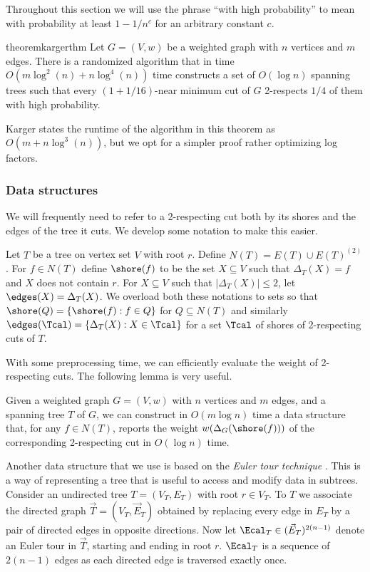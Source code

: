 Throughout this section we will use the phrase ``with high probability'' to mean with probability at least $1-1/n^c$ for an arbitrary constant $c$.
\begin{restatable}{theorem}{kargerthm} \label{thm:karger}
Let $G = (V,w)$ be a weighted graph with $n$ vertices and $m$ edges.  There is a randomized algorithm that in time 
$O(m \log^2(n) + n\log^4(n))$ time constructs a set of $O(\log n)$ spanning trees such that every $(1+1/16)$-near minimum cut of $G$ 2-respects $1/4$ of them with high probability.
\end{restatable}
Karger states the runtime of the algorithm in this theorem as $O(m + n \log^3(n))$, but we opt for a simpler proof rather optimizing log factors.

\subsubsection{Data structures}
We will frequently need to refer to a 2-respecting cut both by its shores and the edges of the tree it cuts.  We develop some notation to make this easier.
\begin{definition}
Let $T$ be a tree on vertex set $V$ with root $r$.  Define $N(T) = E(T) \cup E(T)^{(2)}$.
For $f \in N(T)$ define $\shore(f)$ to be the set $X \subseteq V$  such that $\Delta_T(X) = f$ and $X$ does not contain $r$.
For $X \subseteq V$ such that $|\Delta_T(X)| \le 2$, 
let $\edges(X) = \Delta_T(X)$.  We overload both these notations to sets so that $\shore(Q) = \{\shore(f): f \in Q\}$ for $Q \subseteq N(T)$ and similarly 
$\edges(\Tcal) = \{\Delta_T(X): X \in \Tcal\}$ for a set $\Tcal$ of shores of 2-respecting cuts of $T$.  
\end{definition}

With some preprocessing time, we can efficiently evaluate the weight of 2-respecting cuts.  The following lemma is very useful.
\begin{lemma} \label{lem:eval-cuts}
Given a weighted graph $G = (V,w)$ with $n$ vertices and $m$ edges, and a spanning tree $T$ of $G$, we can construct in $O(m \log n)$ time a data structure that, for any $f \in N(T)$,
reports the weight $w(\Delta_G(\shore(f)))$ of the corresponding 2-respecting cut in $O(\log n)$ time.
\end{lemma}



Another data structure that we use is based on the \emph{Euler tour technique} \cite{TV84,HK95}.
This is a way of representing a tree that is useful to access and modify data in subtrees.
Consider an undirected tree $T=(V_T,E_T)$ with root $r \in V_T$.
To $T$ we associate the directed graph $\vec T = (V_T, \vec E_T)$ obtained by replacing every edge in $E_T$ by a pair of directed edges in opposite directions.
Now let $\Ecal_T \in (\vec E_T)^{2(n-1)}$ denote an Euler tour in $\vec T$, starting and ending in root $r$.
$\Ecal_T$ is a sequence of $2(n-1)$ edges as each directed edge is traversed exactly once.

